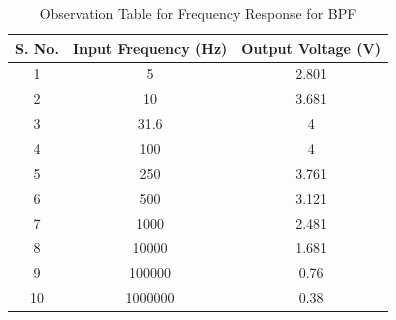 \documentclass[a4paper,12pt]{article}
\begin{document}
\begin{table}[H]
    \centering
    \renewcommand{\arraystretch}{1.3} %
    \begin{tabular}{|c|c|c|}
        \hline
        \textbf{S. No.} & \textbf{Input Frequency (Hz)} &\textbf{Output Voltage (V)} \\
        \hline
        1 & 5 & 2.801  \\
        2 & 10 & 3.681  \\
        3 & 31.6 & 4  \\
        4 & 100 & 4  \\
        5 & 250 & 3.761  \\
        6 & 500 & 3.121  \\
        7 & 1000 & 2.481  \\
        8 & 10000 & 1.681  \\
        9 & 100000 & 0.76  \\
        10 & 1000000 & 0.38  \\
        \hline
    \end{tabular}
    \caption{Observation Table for Frequency Response for BPF}
    \label{tab:observation}
\end{table}
\begin{figure}[H]
    \centering
    \hfill
\end{figure}
\begin{figure}[H]
    \centering
    \hfill
\end{figure}
\end{document}
